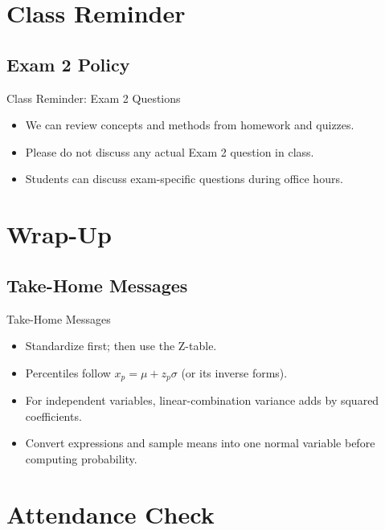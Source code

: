 \documentclass[aspectratio=169]{beamer}
\begin{document}
\section{Class Reminder}

\subsection{Exam 2 Policy}
\begin{frame}{Class Reminder: Exam 2 Questions}
  \begin{itemize}
    \item We can review concepts and methods from homework and quizzes.
    \item Please do not discuss any actual Exam 2 question in class.
    \item Students can discuss exam-specific questions during office hours.
  \end{itemize}
\end{frame}

\section{Wrap-Up}

\subsection{Take-Home Messages}
\begin{frame}{Take-Home Messages}
  \begin{itemize}
    \item Standardize first; then use the Z-table.
    \item Percentiles follow \(x_p=\mu+z_p\sigma\) (or its inverse forms).
    \item For independent variables, linear-combination variance adds by squared coefficients.
    \item Convert expressions and sample means into one normal variable before computing probability.
  \end{itemize}
\end{frame}

\section{Attendance Check}
\end{document}
